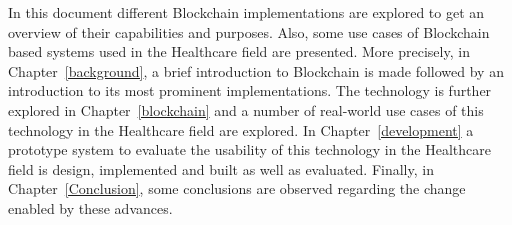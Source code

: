 In this document different Blockchain implementations are explored to get an
overview of their capabilities and purposes. Also, some use cases of Blockchain
based systems used in the Healthcare field are presented. More precisely, in
Chapter~\ref{background}, a brief introduction to Blockchain is made followed
by an introduction to its most prominent implementations. The technology is
further explored in Chapter~\ref{blockchain} and a number of real-world use
cases of this technology in the Healthcare field are explored.  In
Chapter~\ref{development} a prototype system to evaluate the usability of this
technology in the Healthcare field is design, implemented and built as well as
evaluated. Finally, in Chapter~\ref{Conclusion}, some conclusions are observed
regarding the change enabled by these advances.
